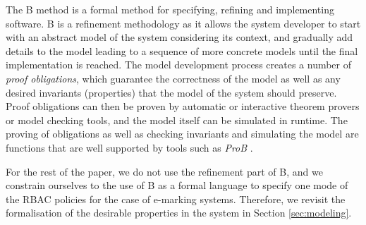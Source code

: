 The B method \cite{Abrial-BBook-1996} is a formal method for specifying, refining and implementing software.  B is a refinement methodology as it allows the system developer to start with an abstract model of the system considering its context, and gradually add details to the model leading to a sequence of more concrete models until the final implementation is reached.  The model development process creates a number of \textit{proof obligations}, which guarantee the correctness of the model as well as any desired invariants (properties) that the model of the system should preserve. Proof obligations can then be proven by automatic or interactive theorem provers or model checking tools, and the model itself can be simulated in runtime.  The proving of obligations as well as checking invariants and simulating the model are functions that are well supported by tools such as \textit{ProB} \cite{LeuschelB03}.

For the rest of the paper, we do not use the refinement part of B, and we constrain ourselves to the use of B as a formal language to specify one mode of the RBAC policies for the case of e-marking systems.   Therefore, we revisit the formalisation of the desirable properties in the system in Section \ref{sec:modeling}.
